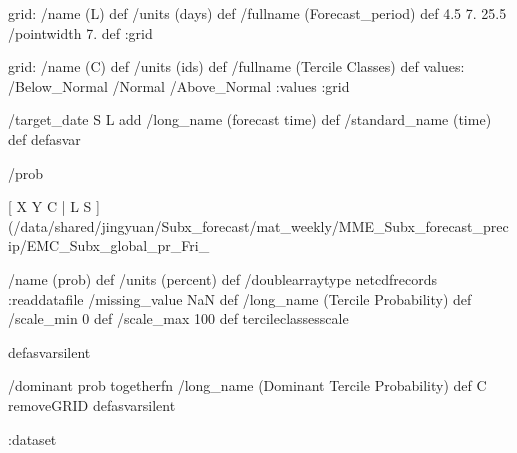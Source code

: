 \begin{ingrid}
grid:
/name (L) def
/units (days) def
/fullname (Forecast_period) def
4.5 7. 25.5
/pointwidth 7. def
:grid

grid:
/name (C) def
/units (ids) def
/fullname (Tercile Classes) def
values: /Below_Normal /Normal /Above_Normal :values
:grid

/target_date { S L add /long_name (forecast time) def /standard_name (time) def } defasvar

/prob {
[ X Y C | L S ] (/data/shared/jingyuan/Subx_forecast/mat_weekly/MME_Subx_forecast_precip/EMC_Subx_global_pr_Fri_%

/name (prob) def
/units (percent) def
/doublearraytype netcdfrecords :readdatafile
/missing_value NaN def
/long_name (Tercile Probability) def
/scale_min 0 def
/scale_max 100 def
tercileclassesscale
} defasvarsilent

/dominant {
prob togetherfn
/long_name (Dominant Tercile Probability) def
C removeGRID
} defasvarsilent

:dataset
\end{ingrid}
